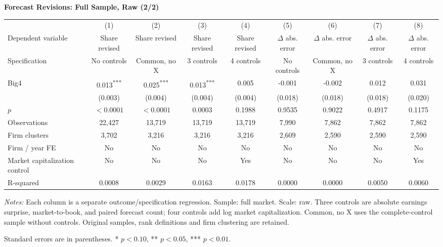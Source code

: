 \documentclass[10pt]{article}
\newcommand{\sym}[1]{\textsuperscript{#1}}
\begin{document}
\begin{minipage}{28.80cm}
\fontsize{10}{12}\selectfont
\setlength{\tabcolsep}{4pt}\renewcommand{\arraystretch}{1.08}
{\large\bfseries Forecast Revisions: Full Sample, Raw (2/2)}\par\medskip
\begin{tabular*}{\linewidth}{@{\extracolsep{\fill}}lcccccccc@{}}
\toprule
 & (1) & (2) & (3) & (4) & (5) & (6) & (7) & (8) \\
Dependent variable & Share revised & Share revised & Share revised & Share revised & $\Delta$ abs. error & $\Delta$ abs. error & $\Delta$ abs. error & $\Delta$ abs. error \\
Specification & No controls & Common, no X & 3 controls & 4 controls & No controls & Common, no X & 3 controls & 4 controls \\
\midrule
Big4 & 0.013\sym{***} & 0.025\sym{***} & 0.013\sym{***} & 0.005 & -0.001 & -0.002 & 0.012 & 0.031 \\
 & (0.003) & (0.004) & (0.004) & (0.004) & (0.018) & (0.018) & (0.018) & (0.020) \\
$p$ & $<0.0001$ & $<0.0001$ & 0.0003 & 0.1988 & 0.9535 & 0.9022 & 0.4917 & 0.1175 \\
\midrule
Observations & 22,427 & 13,719 & 13,719 & 13,719 & 7,990 & 7,862 & 7,862 & 7,862 \\
Firm clusters & 3,702 & 3,216 & 3,216 & 3,216 & 2,609 & 2,590 & 2,590 & 2,590 \\
Firm / year FE & No & No & No & No & No & No & No & No \\
Market capitalization control & No & No & No & Yes & No & No & No & Yes \\
R-squared & 0.0008 & 0.0029 & 0.0163 & 0.0178 & 0.0000 & 0.0000 & 0.0050 & 0.0060 \\
\bottomrule\end{tabular*}\par\medskip
\fontsize{9}{11}\selectfont\textit{Notes:} Each column is a separate outcome/specification regression. Sample: full market. Scale: raw. Three controls are absolute earnings surprise, market-to-book, and paired forecast count; four controls add log market capitalization. Common, no X uses the complete-control sample without controls. Original samples, rank definitions and firm clustering are retained.
\par Standard errors are in parentheses. * $p<0.10$, ** $p<0.05$, *** $p<0.01$.
\end{minipage}
\end{document}
